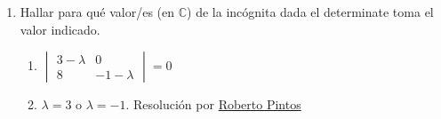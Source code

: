 \documentclass[a4paper]{article}
\newcommand{\answer}{\item[**]}
\newcommand{\exercise}{\item}
\begin{document}
\begin{enumerate}
\begin{multicols}{3}
\begin{enumerate} [label=(\alph*)]
		\item $A=\begin{pmatrix} 2 & 3 & 0 \\ -4 & 4 & 1 \\ 7 & 1 & -1\end{pmatrix}$
		\answer $\det(A)=-1$ por lo que $\exists A^{-1}=\begin{pmatrix} 5 & -3 & -3\\ -3 & 2 & 2 \\ 32 & -19 & -20 \end{pmatrix}$.

		\item $A=\begin{pmatrix} 2 & 4 & 1 \\ -5 & 4 & 5 \\ 3 & 1 & -1\end{pmatrix}$
		\answer $\det(A)=5$ por lo que $\exists A^{-1}=\begin{pmatrix} -\frac{9}{5} & 1 & \frac{16}{5}\\ 2 & -1 & -3 \\ -\frac{17}{5} & 2 & \frac{28}{5} \end{pmatrix}$.

		\item $A=\begin{pmatrix} 1 & 3 & 2 \\ -2 & 3 & 3 \\ -1 & 15 & 12 \end{pmatrix}$
		\answer $\det(A)=0$ por lo que $\nexists A^{-1}$.

		\item $D=\begin{pmatrix} 4 & 14 & -17 & 1 \\ 0 & 1 & 23 & 1 \\ 0 & 0 & 0 & 3 \\ 0 & 0 & 0 & 12 \end{pmatrix}$
		\answer $\det(D)=0$ por lo que $\nexists D^{-1}$.

	\end{enumerate}
	\end{multicols}

	\exercise Hallar para qué valor/es (en $\mathbb{C}$) de la incógnita dada el determinate toma el valor indicado.
	\begin{multicols}{2}
	\begin{enumerate} [label=(\alph*)]
		
		\item $\begin{vmatrix} 3-\lambda & 0 \\ 8 & -1-\lambda \end{vmatrix}=0$
		\answer $\lambda=3$ o $\lambda=-1$. Resolución por \href{https://youtu.be/Rw531O86QVw?t=376}{Roberto Pintos}


\end{enumerate}
\end{multicols}
\end{enumerate}
\end{document}
